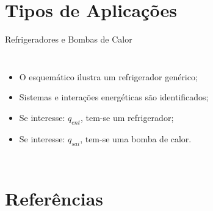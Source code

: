 \section{Tipos de Aplicações}

    \begin{frame}\vspace*{-0em}
    \end{frame}

    \begin{frame}{Refrigeradores e Bombas de Calor}\vspace*{-0em}
        \begin{columns}
            \begin{itemize}
                \item<1-> O \alert{esquemático} ilustra um \alert{refrigerador genérico};
                    \\[\medskipamount]
                \item<1-> \alert{Sistemas} e \alert{interações energéticas} são identificados;
                    \\[\medskipamount]
                \item<2-> Se \alert{interesse}: $q_{ent}$, tem-se um \alert{refrigerador};
					\\[\medskipamount]
                \item<2-> Se \alert{interesse}: $q_{sai}$, tem-se uma \alert{bomba de calor}.
            \end{itemize}
		\end{columns}
    \end{frame}


\section{Referências}

